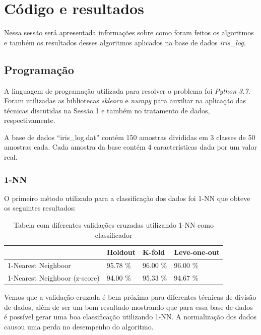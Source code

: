\documentclass[paper=a4, fontsize=11pt]{scrartcl}
\numberwithin{equation}{section}		%
\numberwithin{figure}{section}			%
\numberwithin{table}{section}				%
\begin{document}
\newpage

\section{Código e resultados}

Nessa sessão será apresentada informações sobre como foram feitos os algoritmos e também os resultados desses algoritmos aplicados na base de dados \textit{iris\_log}.

\subsection{Programação}

A linguagem de programação utilizada para resolver o problema foi \textit{Python 3.7}. Foram utilizadas as bibliotecas \textit{sklearn} e \textit{numpy} para auxiliar na aplicação das técnicas discutidas na Sessão 1 e também no tratamento de dados, respectivamente. 

A base de dados “iris\_log.dat” contém 150 amostras divididas em 3 classes de 50 amostras cada. Cada amostra da base contém 4 características dada por um valor real.

\subsubsection{1-NN}
O primeiro método utilizado para a classificação dos dados foi 1-NN que obteve os seguintes resultados:

\begin{table}[h!]
\begin{tabular}{l|l|l|l|}
\cline{2-4}
                                                       & Holdout  & K-fold   & Leve-one-out \\ \hline
\multicolumn{1}{|l|}{1-Nearest Neighboor}              & 95.78 \% & 96.00 \% & 96.00 \%     \\ \hline
\multicolumn{1}{|l|}{1-Nearest Neighboor (z-score)}    & 94.00 \% & 95.33 \% & 94.67 \%     \\ \hline
\end{tabular}
\caption{Tabela com diferentes validações cruzadas utilizando 1-NN como classificador}
\end{table}

Vemos que a validação cruzada é bem próxima para diferentes técnicas de divisão de dados, além de ser um bom resultado mostrando que para essa base de dados é possível gerar uma boa classificação utilizando 1-NN.
A normalização dos dados causou uma perda no desempenho do algoritmo.
\end{document}
